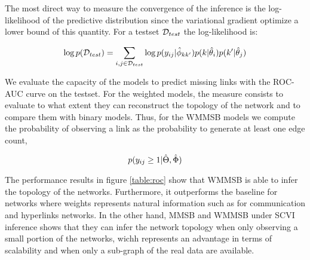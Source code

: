 %
%

The most direct way to measure the convergence of the inference is the log-likelihood of the predictive distribution since the variational gradient optimize a lower bound of this quantity. For a testset $\mathcal{D}_{test}$ the log-likelihood is:



\begin{equation*}
\log p(\mathcal{D}_{test}) = \sum_{i,j \in \mathcal{D}_{test}} \log p(y_{ij} | \hat\phi_{kk'}) p(k|\hat\theta_i) p(k'|\hat\theta_j)
\end{equation*}


%
%

We evaluate the capacity of the models to predict missing links with the ROC-AUC curve on the testset. For the weighted models, the measure consists to evaluate to what extent they can reconstruct the topology of the network and to compare them with binary models. Thus, for the WMMSB models we compute the probability of observing a link as the probability to generate at least one edge count,

\begin{table}
\label{table:roc}
	
\end{table}

\begin{equation*}
p(y_{ij} \geq 1 | \hat\Theta, \hat\Phi)
\end{equation*}

The performance results in figure \ref{table:roc} show that WMMSB is able to infer the topology of the networks. Furthermore, it outperforms the baseline for networks where weights represents natural information such as for communication and hyperlinks networks. 
In the other hand, MMSB and WMMSB under SCVI inference shows that they can infer the network topology when only observing a small portion of the networks, wichh represents an advantage in terms of scalability and when only a sub-graph of the real data are available.

%
%

%



%
%




